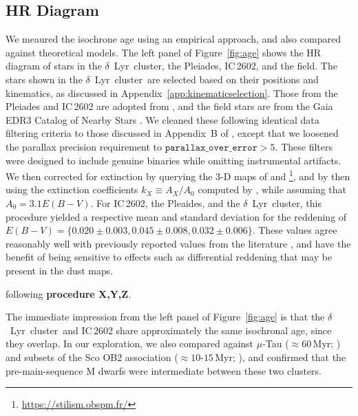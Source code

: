 \documentclass[12pt,modern,twocolumn,tighten]{aastex63}
\newcommand{\cn}{$\delta$~Lyr\ cluster} %
\begin{document}
\subsection{HR Diagram}
We meaured the isochrone age using an empirical approach, and also
compared against theoretical models.  The left panel of
Figure~\ref{fig:age} shows the HR diagram of stars in the \cn, the
Pleiades, IC\,2602, and the field.  The stars shown in the \cn\ are
selected based on their positions and kinematics, as discussed in
Appendix~\ref{app:kinematicselection}.  Those from the Pleiades and
IC\,2602 are adopted from \citet{cantatgaudin_gaia_2018}, and the
field stars are from the Gaia EDR3 Catalog of Nearby Stars
\citep{gaia_gcns_2021}.  We cleaned these following identical data
filtering criteria to those discussed in Appendix~B of
\citet{GaiaCollaboration2018}, except that we loosened the parallax
precision requirement to $\texttt{parallax\_over\_error}>5$.  These
filters were designed to include genuine binaries while omitting
instrumental artifacts.  We then corrected for extinction by querying
the 3-D maps of \citet{capitanio_threedimensional_2017} and
\citet{lallement_threedimensional_2018}\footnote{\url{https://stilism.obspm.fr/}},
and by then using the extinction coefficients $k_X\equiv A_X/A_0$
computed by \citet{GaiaCollaboration2018}, while assuming that $A_0 =
3.1 E(B-V)$.  For IC\,2602, the Pleaides, and the \cn, this procedure
yielded a respective mean and standard deviation for the reddening of
$E(B-V)=\{0.020\pm0.003, 0.045\pm0.008, 0.032\pm0.006\}$.  These
values agree reasonably well with previously reported values from the
literature \citep[{\it
e.g.},][]{GaiaCollaboration2018,kounkel_untangling_2019,bossini_age_2019},
and have the benefit of being sensitive to effects such as
differential reddening that may be present in the dust maps.

%
%
%


following {\bf procedure X,Y,Z}.


The immediate impression from the left panel of Figure~\ref{fig:age}
is that the \cn\ and IC\,2602 share approximately the same isochronal
age, since they overlap.  In our exploration, we also compared against
$\mu$-Tau ($\approx 60$\,Myr; \citealt{gagne_mutau_2020}) and subsets
of the Sco OB2 association ($\approx10$-$15$\,Myr;
\citealt{damiani_stellar_2019}), and confirmed that the
pre-main-sequence M dwarfs were intermediate between these two
clusters.
\end{document}
